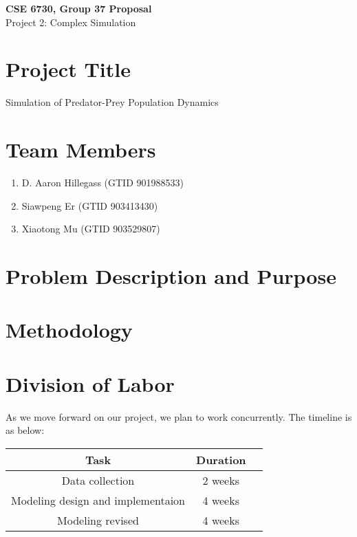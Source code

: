 \documentclass{article}
\begin{document}
	\begin{center}
    
		\LARGE{\textbf{CSE 6730, Group 37 Proposal}} \\
        \vspace{1em}
        \Large{Project 2: Complex Simulation} \\
     
	\end{center}
    \begin{normalsize}
    
    	\section{Project Title}
        
Simulation of Predator-Prey Population Dynamics
      
		\section{Team Members}
        
      \begin{enumerate}
      	\item D. Aaron Hillegass (GTID 901988533)
      	\item Siawpeng Er (GTID 903413430)
      	\item Xiaotong Mu (GTID 903529807)
      \end{enumerate}
        
	\section{Problem Description and Purpose}
        

   	\section{Methodology}
 
    \section{Division of Labor}
    As we move forward on our project, we plan to work concurrently. The timeline is as below:
       
    \begin{center}
    	\begin{tabular}{ |c|c|c| } 
    		\hline
    		Task & Duration  \\ 
    		\hline
    		Data collection & 2 weeks \\ 
    		Modeling design and implementaion & 4 weeks \\ 
    		Modeling revised & 4 weeks \\ 
    		\hline
    	\end{tabular}
    \end{center}
    
    
    
    
    
\end{normalsize}
  
\end{document}
